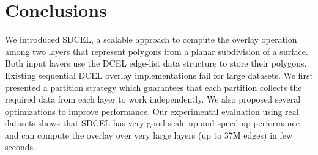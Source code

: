 \section{Conclusions} \label{sec:conclusions}
We introduced SDCEL, a scalable approach to compute the overlay operation among two layers that represent polygons from a planar subdivision of a surface. Both input layers use the DCEL edge-list data structure to store their polygons. Existing sequential DCEL overlay implementations fail for large datasets. We first presented a partition strategy which guarantees that each partition collects the required data from each layer to work independently. 
We also proposed several optimizations to improve performance. Our experimental evaluation using real datasets shows that SDCEL has very good scale-up and speed-up performance and can compute the overlay over very large layers (up to 37M edges) in few seconds.

